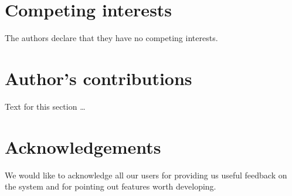 \documentclass{bmcart}
\begin{document}

\begin{backmatter}

\section*{Competing interests}
  The authors declare that they have no competing interests.

\section*{Author's contributions}
    Text for this section \ldots

\section*{Acknowledgements}
We would like to acknowledge all our users for providing us useful feedback on
the system and for pointing out features worth developing.





\end{backmatter}
\end{document}
